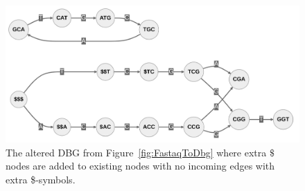 \begin{figure}[t]
  \centering
  \includegraphics[width=\textwidth]{images/FastaqToDbgWithDollars.png}
  \caption{The altered DBG from Figure~\ref{fig:FastaqToDbg} where extra $\$$ nodes are added to existing nodes with no incoming edges with extra \$-symbols.}\label{fig:FastaqToDbgWithDollars}
\end{figure}
